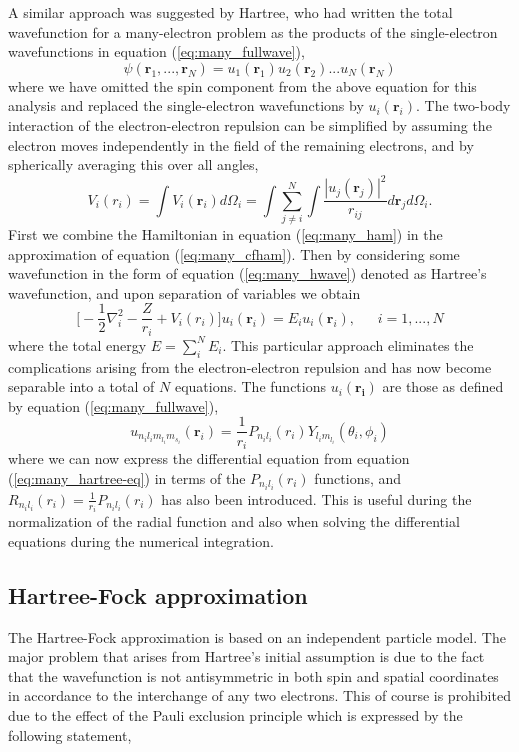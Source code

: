 A similar approach was suggested by Hartree, who had written the total wavefunction for a many-electron problem as the products of the single-electron wavefunctions in equation (\ref{eq:many_fullwave}),
\begin{equation}\label{eq:many_hwave}
\psi(\boldsymbol{r}_1, ..., \boldsymbol{r}_N) = u_1(\boldsymbol{r}_1)u_2(\boldsymbol{r}_2)...u_N(\boldsymbol{r}_N)
\end{equation}
where we have omitted the spin component from the above equation for this analysis and replaced the single-electron wavefunctions by $u_i(\boldsymbol{r}_i)$. The two-body interaction of the electron-electron repulsion can be simplified by assuming the electron moves independently in the field of the remaining electrons, and by spherically averaging this over all angles,
\[
V_i(r_i) = \int V_i(\boldsymbol{r}_i)d\Omega_i = \int \sum_{j\ne i}^{N}\int\frac{|u_j(\boldsymbol{r}_j)|^2}{r_{ij}}  d\boldsymbol{r}_jd\Omega_i.
\]
First we combine the Hamiltonian in equation (\ref{eq:many_ham}) in the approximation of equation (\ref{eq:many_cfham}). Then by considering some wavefunction in the form of equation (\ref{eq:many_hwave}) denoted as Hartree's wavefunction, and upon separation of variables we obtain
	\begin{equation}\label{eq:many_hartree-eq}
	\Big[-\frac{1}{2}\nabla_{i}^2-\frac{Z}{r_i}+V_i(r_i)\Big]u_i(\boldsymbol{r}_i)=E_iu_i(\boldsymbol{r}_i), ~~~~~~~ i=1,...,N
	\end{equation}
where the total energy $E =\sum_i^NE_i$. This particular approach eliminates the complications arising from the electron-electron repulsion and has now become separable into a total of $N$ equations. The functions $u_i(\boldsymbol{r_i})$ are those as defined by equation (\ref{eq:many_fullwave}),
\begin{equation}\label{eq:many_orbitals}
u_{n_il_im_{l_i}m_{s_i}}(\boldsymbol{r}_i) = \frac{1}{r_i}P_{n_il_i}(r_i)Y_{l_im_{l_i}}(\theta_i,\phi_i)
\end{equation}
where we can now express the differential equation from equation (\ref{eq:many_hartree-eq}) in terms of the $P_{n_il_i}(r_i)$ functions, and $R_{n_il_i}(r_i) = \frac{1}{r_i}P_{n_il_i}(r_i)$ has also been introduced. This is useful during the normalization of the radial function and also when solving the differential equations during the numerical integration.

\subsection{Hartree-Fock approximation}\label{ssec:hf}
The Hartree-Fock approximation is based on an independent particle model. The major problem that arises from Hartree's initial assumption is due to the fact that the wavefunction is not antisymmetric in both spin and spatial coordinates in accordance to the interchange of any two electrons. This of course is prohibited due to the effect of the Pauli exclusion principle which is expressed by the following statement,

